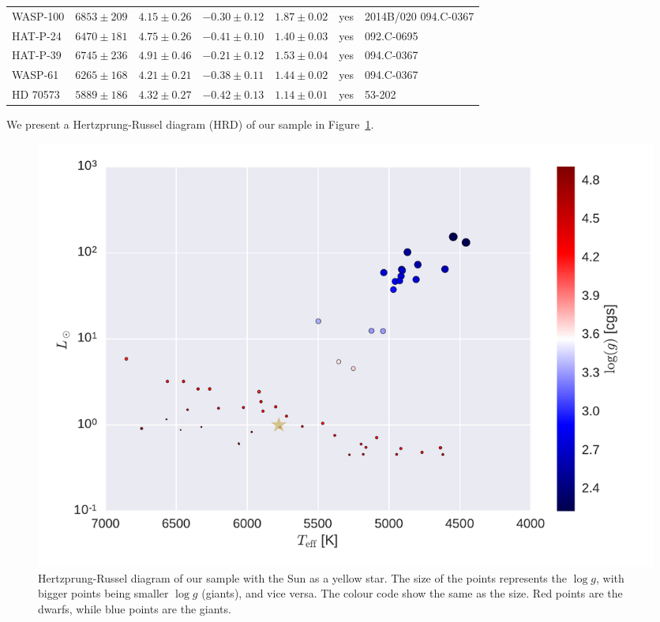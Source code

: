 \documentclass{aa}
\begin{document}
\begin{table}[htb!]
\begin{tabular}{lllllll}
     WASP-100     &  $6853 \pm 209$      &  $4.15 \pm 0.26$    &  $-0.30 \pm 0.12$    &  $1.87 \pm 0.02$             &             yes             &  2014B/020  094.C-0367                                                                                                   \\
     HAT-P-24     &  $6470 \pm 181$      &  $4.75 \pm 0.26$    &  $-0.41 \pm 0.10$    &  $1.40 \pm 0.03$             &             yes             &  092.C-0695                                                                                                              \\
     HAT-P-39     &  $6745 \pm 236$      &  $4.91 \pm 0.46$    &  $-0.21 \pm 0.12$    &  $1.53 \pm 0.04$             &             yes             &  094.C-0367                                                                                                              \\
      WASP-61     &  $6265 \pm 168$      &  $4.21 \pm 0.21$    &  $-0.38 \pm 0.11$    &  $1.44 \pm 0.02$             &             yes             &  094.C-0367                                                                                                              \\
     HD 70573     &  $5889 \pm 186$      &  $4.32 \pm 0.27$    &  $-0.42 \pm 0.13$    &  $1.14 \pm 0.01$             &             yes             &  53-202                                                                                                                  \\
      \hline
    \end{tabular}
\end{table}
We present a Hertzprung-Russel diagram (HRD) of our sample in
Figure~\ref{fig:HRD}.
\begin{figure}[tpb]
    \centering
    \includegraphics[width=1.0\linewidth]{figures/HR.pdf}
    \caption{Hertzprung-Russel diagram of our sample with the Sun as a yellow
    star. The size of the points represents the $\log g$, with bigger points
    being smaller $\log g$ (giants), and vice versa. The colour code show the
    same as the size. Red points are the dwarfs, while blue points are the
    giants.}
    \label{fig:HRD}
\end{figure}
\end{document}
